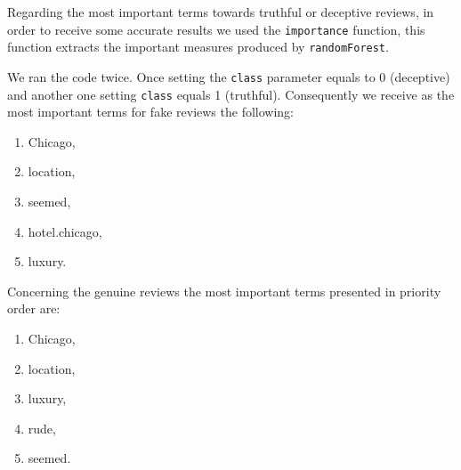 \documentclass[a4paper,11pt]{article}
\begin{document}
Regarding the most important terms towards truthful or deceptive reviews, in order to receive some accurate results we used the \verb|importance| function, this function extracts the important measures produced by \verb|randomForest|.

We ran the code twice. Once setting the \verb|class| parameter equals to 0 (deceptive) and another one setting \verb|class| equals 1 (truthful). Consequently we receive as the most important terms for fake reviews
the following: 
\begin{enumerate}
	\item Chicago, 
	\item location, 
	\item seemed, 
	\item hotel.chicago,
	\item luxury. 
\end{enumerate}
Concerning the genuine reviews the most important terms presented in priority order are: 
\begin{enumerate}
	\item Chicago, 
	\item location, 
	\item luxury, 
	\item rude, 
	\item seemed.
\end{enumerate}



\end{document}
